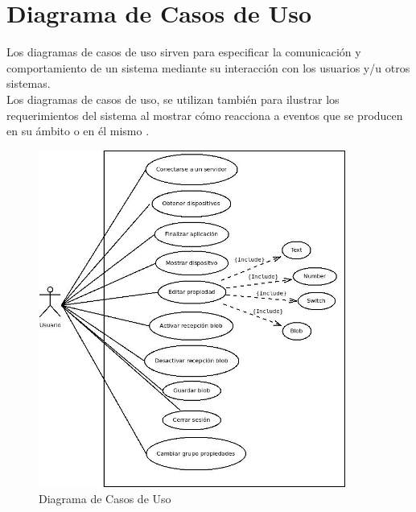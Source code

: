 \section{Diagrama de Casos de Uso}
Los diagramas de casos de uso sirven para especificar la comunicación y comportamiento de un sistema mediante su interacción con los usuarios y/u otros sistemas.\\
Los diagramas de casos de uso, se utilizan también para ilustrar los requerimientos del sistema al mostrar cómo reacciona a eventos que se producen en su ámbito o en él mismo \cite{CasosUso}.

\begin{figure}[htb]
\centering
\includegraphics[width=0.9\textwidth]{./imagenes/DiagramaCasosUsoFinal}
\caption{Diagrama de Casos de Uso} \label{fig:DiagramaCasosUsoFinal}
\end{figure}
